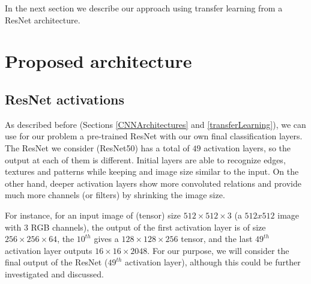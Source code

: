 In the next section we describe our approach using transfer learning from a ResNet architecture.





\section{Proposed architecture}

\subsection{ResNet activations}

As described before (Sections \ref{CNNArchitectures} and \ref{transferLearning}), we can use for our problem a pre-trained ResNet with our own final classification layers. The ResNet we consider (ResNet50) has a total of $49$ activation layers, so the output at each of them is different. Initial layers are able to recognize edges, textures and patterns while keeping and image size similar to the input. On the other hand, deeper activation layers show more convoluted relations and provide much more channels (or filters) by shrinking the image size.

For instance, for an input image of (tensor) size $512 \times 512 \times 3$ (a $512x512$ image with $3$ RGB channels), the output of the first activation layer is of size $256 \times 256 \times 64$, the $10^{th}$ gives a $128 \times 128 \times 256$ tensor, and the last $49^{th}$ activation layer outputs $16 \times 16 \times 2048$. For our purpose, we will consider the final output of the ResNet ($49^{th}$ activation layer), although this could be further investigated and discussed.

